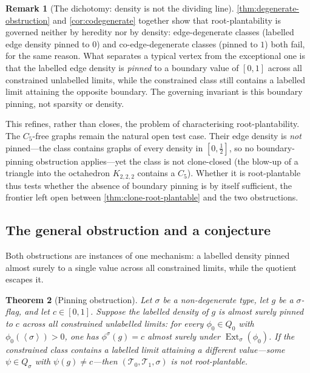 \documentclass[11pt]{article}
\newtheorem{theorem}{Theorem}
\theoremstyle{definition}
\newtheorem{remark}[theorem]{Remark}
\newcommand{\T}{\mathcal{T}}
\newcommand{\Ext}{\operatorname{Ext}}
\newcommand{\brak}[1]{\left\langle #1\right\rangle}
\begin{document}
\begin{remark}[The dichotomy: density is not the dividing line]
\cref{thm:degenerate-obstruction} and \cref{cor:codegenerate}
together show that root-plantability is governed neither by heredity nor by density:
edge-degenerate classes (labelled edge density pinned to $0$) and co-edge-degenerate
classes (pinned to $1$) both fail, for the same reason.  What separates a typical
vertex from the exceptional one is that the labelled edge density is \emph{pinned} to a
boundary value of $[0,1]$ across all constrained unlabelled limits, while the
constrained class still contains a labelled limit attaining the opposite boundary.  The
governing invariant is this boundary pinning, not sparsity or density.

This refines, rather than closes, the problem of characterising root-plantability.
The $C_5$-free graphs remain the natural open test case.  Their edge density is
\emph{not} pinned---the class contains graphs of every density in $[0,\tfrac12]$, so
no boundary-pinning obstruction applies---yet the class is not clone-closed (the
blow-up of a triangle into the octahedron $K_{2,2,2}$ contains a $C_5$).  Whether it
is root-plantable thus tests whether the absence of boundary pinning is by itself
sufficient, the frontier left open between \cref{thm:clone-root-plantable}
and the two obstructions.
\end{remark}

\subsection{The general obstruction and a conjecture}

Both obstructions are instances of one mechanism: a labelled density pinned almost
surely to a single value across all constrained limits, while the quotient escapes
it.

\begin{theorem}[Pinning obstruction]\label{thm:pinning}
Let $\sigma$ be a non-degenerate type, let $g$ be a $\sigma$-flag, and let
$c\in[0,1]$.  Suppose the labelled density of $g$ is almost surely pinned to $c$ across
all constrained unlabelled limits: for every $\phi_0\in Q_0$ with
$\phi_0(\brak\sigma)>0$, one has $\phi^\sigma(g)=c$ almost surely under
$\Ext_\sigma(\phi_0)$.  If the constrained class contains a labelled limit attaining a different
value---some $\psi\in Q_\sigma$ with $\psi(g)\ne c$---then $(\T_0,\T_1,\sigma)$ is not
root-plantable.
\end{theorem}
\end{document}
